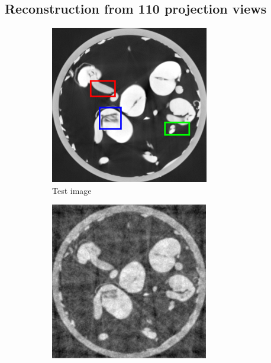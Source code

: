 \documentclass{article}
\begin{document}
\newpage
\subsection{Reconstruction from 110 projection views}
\begin{figure}[h]
    \begin{subfigure}[b]{0.3\linewidth}
        \includegraphics[width=\textwidth]{../images/supplementary/2D_sprouts/colorTestIm.png}
        \caption{Test image}
     \end{subfigure}
    \begin{subfigure}[b]{0.3\linewidth}
        \includegraphics[width=\textwidth]{../images/supplementary/2D_sprouts/92_angles/1/fbp.png}

\end{subfigure}
\end{figure}
\end{document}
